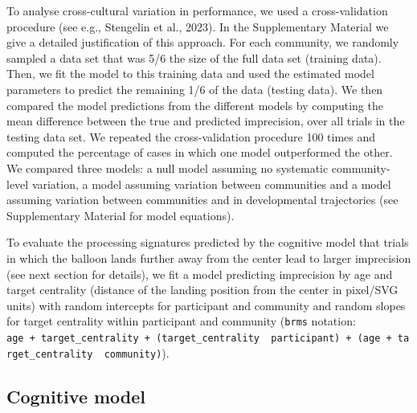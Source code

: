 \documentclass[
  man,floatsintext]{apa7}
\begin{document}
To analyse cross-cultural variation in performance, we used a cross-validation procedure (see e.g., Stengelin et al., 2023). In the Supplementary Material we give a detailed justification of this approach. For each community, we randomly sampled a data set that was 5/6 the size of the full data set (training data). Then, we fit the model to this training data and used the estimated model parameters to predict the remaining 1/6 of the data (testing data). We then compared the model predictions from the different models by computing the mean difference between the true and predicted imprecision, over all trials in the testing data set. We repeated the cross-validation procedure 100 times and computed the percentage of cases in which one model outperformed the other. We compared three models: a null model assuming no systematic community-level variation, a model assuming variation between communities and a model assuming variation between communities and in developmental trajectories (see Supplementary Material for model equations).

To evaluate the processing signatures predicted by the cognitive model that trials in which the balloon lands further away from the center lead to larger imprecision (see next section for details), we fit a model predicting imprecision by age and target centrality (distance of the landing position from the center in pixel/SVG units) with random intercepts for participant and community and random slopes for target centrality within participant and community (\texttt{brms} notation: \texttt{age\ +\ target\_centrality\ +\ (target\_centrality\ \textbar{}\ participant)\ +\ (age\ +\ target\_centrality\ \textbar{}\ community)}).

\subsection{Cognitive model}\label{cognitive-model}
\end{document}
